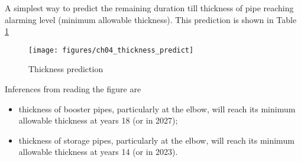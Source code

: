 


A simplest way to predict the remaining duration till thickness of pipe reaching alarming level (minimum allowable thickness). This prediction is shown in Table \ref{ch04_thickness_predict}


\begin{figure}[!htb]
	\texttt{[image: figures/ch04\_thickness\_predict]} \\
	\caption{Thickness prediction}
	\label{ch04_thickness_predict} 
\end{figure}

Inferences from reading the figure are

\begin{itemize}
\item thickness of booster pipes, particularly at the elbow, will reach its minimum allowable thickness at years 18 (or in 2027);
\item thickness of storage pipes, particularly at the elbow, will reach its minimum allowable thickness at years 14 (or in 2023).
\end{itemize}

